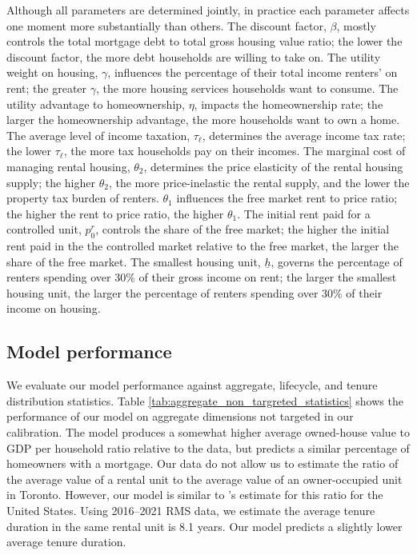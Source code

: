 \documentclass[parskip=full]{article}
\begin{document}
Although all parameters are determined jointly, in practice each parameter affects one moment more substantially than others. The discount factor, $\beta$, mostly controls the total mortgage debt to total gross housing value ratio; the lower the discount factor, the more debt households are willing to take on. The utility weight on housing, $\gamma$, influences the percentage of their total income renters' on rent; the greater $\gamma$, the more housing services households want to consume. The utility advantage to homeownership, $\eta$, impacts the homeownership rate; the larger the homeownership advantage, the more households want to own a home. The average level of income taxation, $\tau_{\ell}$, determines the average income tax rate; the lower $\tau_{\ell}$, the more tax households pay on their incomes. The marginal cost of managing rental housing, $\theta_{2}$, determines the price elasticity of the rental housing supply; the higher $\theta_{2}$, the more price-inelastic the rental supply, and the lower the property tax burden of renters. $\theta_{1}$ influences the free market rent to price ratio; the higher the rent to price ratio, the higher $\theta_{1}$. The initial rent paid for a controlled unit, $p^{r}_{0}$, controls the share of the free market; the higher the initial rent paid in the the controlled market relative to the free market, the larger the share of the free market. The smallest housing unit, $\underline{h}$, governs the percentage of renters spending over 30\% of their gross income on rent; the larger the smallest housing unit, the larger the percentage of renters spending over 30\% of their income on housing.

\subsection{Model performance}\label{subsection:non_targeted_statistics}

We evaluate our model performance against aggregate, lifecycle, and tenure distribution statistics. Table \ref{tab:aggregate_non_targreted_statistics} shows the performance of our model on aggregate dimensions not targeted in our calibration. The model produces a somewhat higher average owned-house value to GDP per household ratio relative to the data, but predicts a similar percentage of homeowners with a mortgage. Our data do not allow us to estimate the ratio of the average value of a rental unit to the average value of an owner-occupied unit in Toronto. However, our model is similar to \citet{chatterjee-eyigungor-2015}'s estimate for this ratio for the United States. Using 2016--2021 RMS data, we estimate the average tenure duration in the same rental unit is 8.1 years. Our model predicts a slightly lower average tenure duration. 
\end{document}
